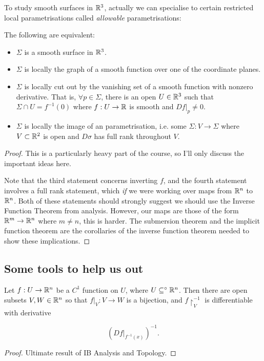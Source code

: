 \documentclass[11pt]{scrartcl}
\begin{document}
To study smooth surfaces in $\mathbb R^3$, actually we can specialise to certain restricted local parametrisations called \textit{allowable} parametrisations:

\begin{theorem}
The following are equivalent:

\begin{itemize}
    \item $\Sigma$ is a smooth surface in $\mathbb R^3$. 
    \item $\Sigma$ is locally the graph of a smooth function over one of the coordinate planes.
    \item $\Sigma$ is locally cut out by the vanishing set of a smooth function with nonzero derivative. That is, $\forall p \in \Sigma$, there is an open $U \in \mathbb R^3$ such that $\Sigma \cap U = f^{-1}(0)$ where $f : U \rightarrow \mathbb R$ is smooth and $Df|_p \neq 0$.
    \item $\Sigma$ is locally the image of an  parametrisation, i.e. some $\Sigma : V \rightarrow \Sigma$ where $V \subset \mathbb R^2$ is open and $D \sigma$ has full rank throughout $V$.
\end{itemize}

\begin{proof}
    This is a particularly heavy part of the course, so I'll only discuss the important ideas here.

    Note that the third statement concerns inverting $f$, and the fourth statement involves a full rank statement, which \textit{if} we were working over maps from $\mathbb R^n$ to $\mathbb R^n$. Both of these statements should strongly suggest we should use the Inverse Function Theorem from analysis. However, our maps are those of the form $\mathbb R^m \rightarrow \mathbb R^n$ where $m \neq n$, this is harder. The submersion theorem and the implicit function theorem are the corollaries of the inverse function theorem needed to show these implications.

\end{proof}
\end{theorem}

\subsection{Some tools to help us out}

\begin{theorem}
Let $f:U \rightarrow \mathbb R^n$ be a $C^1$ function on $U$, where $U \subseteq^\circ \mathbb R^n$. Then there are open subsets $V, W \in \mathbb R^n$ so that $f|_V : V \rightarrow W$ is a bijection, and $f\upharpoonright_V^{-1}$ is differentiable with derivative

\begin{equation}
    (Df|_{f^{-1}(x)})^{-1}.
\end{equation}
\begin{proof}
Ultimate result of IB Analysis and Topology.
\end{proof}
\end{theorem}
\end{document}
